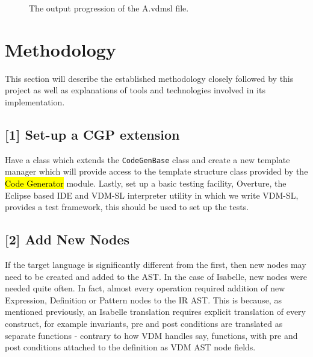\begin{figure}
        \caption{\label{fig:OES} The output progression of the A.vdmsl file.}
\end{figure}

\section{Methodology}
This section will describe the established methodology closely followed by this project as well as explanations of tools and technologies involved in its implementation.

	\subsection{	[1] Set-up a CGP extension} \label{s1}
	Have a class which extends the \lstinline[language=Java]{CodeGenBase} class and create a new template manager which will provide access to the template structure class provided by the \ttfamily\hl{Code Generator} \rmfamily module. Lastly, set up a basic testing facility, Overture, the Eclipse based IDE and VDM-SL interpreter utility in which we write VDM-SL, provides a test framework, this should be used to set up the tests. 
	\subsection{	[2] Add New Nodes}
	If the target language is significantly different from the first, then new nodes may need to be created and added to the AST. In the case of Isabelle, new nodes were needed quite often. In fact, almost every operation required addition of new Expression, Definition or Pattern nodes to the IR AST. This is because, as mentioned previously, an Isabelle translation requires explicit translation of every construct, for example invariants, pre and post conditions are translated as separate functions - contrary to how VDM handles say, functions, with pre and post conditions attached to the definition as VDM AST node fields.
